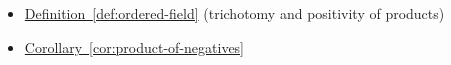 \begin{dependencies}
\begin{itemize}
  \item \hyperref[def:ordered-field]{Definition~\ref*{def:ordered-field}}
        \textnormal{(trichotomy and positivity of products)}
  \item \hyperref[cor:product-of-negatives]{Corollary~\ref*{cor:product-of-negatives}}
\end{itemize}
\end{dependencies}

\clearpage
